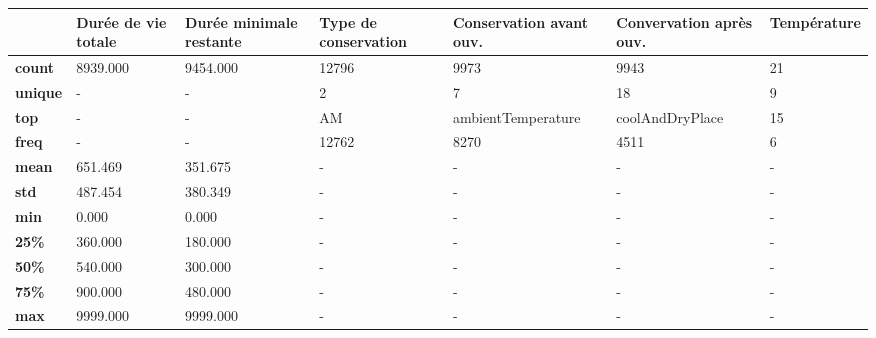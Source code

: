 \begin{tabularx}{\linewidth}{lXXXXXX}
\toprule
{} &  Durée de vie totale &  Durée minimale restante & Type de conservation & Conservation avant ouv. & Convervation après ouv. & Température \\
\midrule
\textbf{count } &             8939.000 &                 9454.000 &                12796 &                    9973 &                    9943 &          21 \\
\textbf{unique} &                    - &                        - &                    2 &                       7 &                      18 &           9 \\
\textbf{top   } &                    - &                        - &                   AM &      ambientTemperature &         coolAndDryPlace &          15 \\
\textbf{freq  } &                    - &                        - &                12762 &                    8270 &                    4511 &           6 \\
\textbf{mean  } &              651.469 &                  351.675 &                    - &                       - &                       - &           - \\
\textbf{std   } &              487.454 &                  380.349 &                    - &                       - &                       - &           - \\
\textbf{min   } &                0.000 &                    0.000 &                    - &                       - &                       - &           - \\
\textbf{25\%   } &              360.000 &                  180.000 &                    - &                       - &                       - &           - \\
\textbf{50\%   } &              540.000 &                  300.000 &                    - &                       - &                       - &           - \\
\textbf{75\%   } &              900.000 &                  480.000 &                    - &                       - &                       - &           - \\
\textbf{max   } &             9999.000 &                 9999.000 &                    - &                       - &                       - &           - \\
\bottomrule
\end{tabularx}
